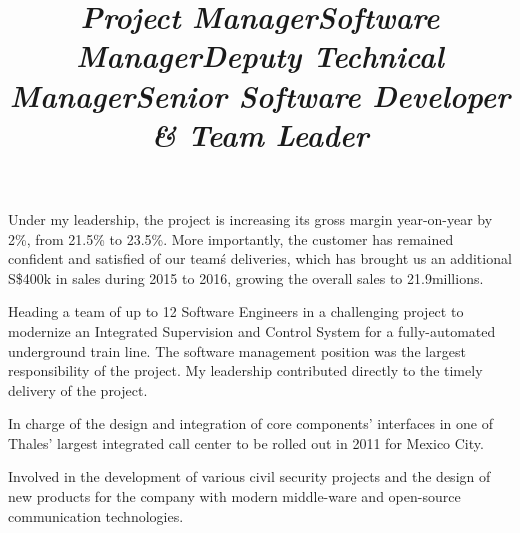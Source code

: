 \documentclass[overlapped,line,letterpaper]{res}
\begin{document}
\begin{resume}
  \title{\em Project Manager}
  \begin{position}
    Under my leadership, the project is increasing its gross margin year-on-year
    by 2\%, from 21.5\% to 23.5\%. More importantly, the customer has remained
    confident and satisfied of our team\'s deliveries, which has brought us an
    additional S\$400k in sales during 2015 to 2016, growing the overall sales
    to 21.9millions.
  \end{position}

  \title{\em Software Manager}
  \begin{position}
    Heading a team of up to 12 Software Engineers in a challenging project to
    modernize an Integrated Supervision and Control System for a fully-automated
    underground train line. The software management position was the largest
    responsibility of the project. My leadership contributed directly to the
    timely delivery of the project.
  \end{position}

  \title{\em Deputy Technical Manager}
  \begin{position}
    In charge of the design and integration of core components' interfaces in
    one of Thales' largest integrated call center to be rolled out in 2011 for
    Mexico City.
  \end{position}

  \title{\em Senior Software Developer \& Team Leader}
  \begin{position}
    Involved in the development of various civil security projects and the
    design of new products for the company with modern middle-ware and
    open-source communication technologies.
  \end{position}





\end{resume}
\end{document}
